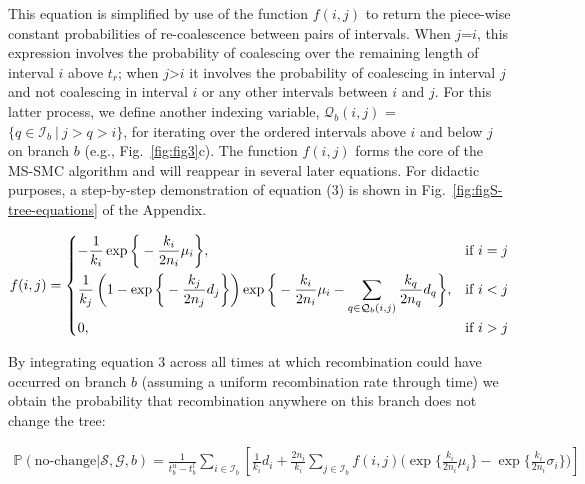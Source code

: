 \documentclass[11pt]{article}
\begin{document}
\noindent This equation is simplified by use of the function $f(i,j)$
to return the piece-wise constant probabilities of re-coalescence between
pairs of intervals. When $j$=$i$, this expression involves the probability of 
coalescing over the remaining length of interval $i$ above $t_r$; 
when $j$>$i$ it involves the probability of coalescing in interval 
$j$ and not coalescing in interval $i$ or any other intervals 
between $i$ and $j$. For this latter process, we define another
indexing variable, $\mathcal{Q}_b(i,j)$ = $\{q \in \mathcal{I}_b ~|~ j > q > i\}$, 
for iterating over the ordered intervals above $i$ and below $j$ 
on branch $b$ (e.g., Fig.~\ref{fig:fig3}c).
The function $f(i,j)$ forms the core of the MS-SMC algorithm and 
will reappear in several later equations. 
For didactic purposes, a step-by-step demonstration of equation (3) 
is shown in Fig.~\ref{fig:figS-tree-equations} of the Appendix.

\begin{equation}
\begin{aligned}	
	f(i,j) = 
	\begin{dcases}
		- \frac{1}{k_i} \exp \bigg\{-\frac{k_i}{2n_i}\mu_i \bigg\}, 
		& \text{if } i=j\\
		\frac{1}{k_j} \left(1 - \exp \bigg\{ -\frac{k_j}{2n_j} d_j \bigg\} 
		\right)
		\exp \bigg\{ -\frac{k_i}{2n_i}\mu_i - 
		\sum_{q \in \mathcal{Q}_b(i,j)} \frac{k_q}{2n_q} d_q \bigg \}, 
		& \text{if } i<j\\
		0, 
		& \text{if } i>j\\
	\end{dcases}
\end{aligned}
\end{equation}


\noindent By integrating equation 3 across all times at which recombination could
have occurred on branch $b$ (assuming a uniform recombination rate through time) 
we obtain the probability that recombination anywhere on this branch does not 
change the tree:


\begin{equation}
\begin{aligned}
	\mathbb{P}(\textrm{no-change} | \mathcal{S},\mathcal{G},b) = 
	\frac{1}{t_b^u - t_b^l}
	\sum_{i \in \mathcal{I}_b} \left[\frac{1}{k_i} d_i + 
	\frac{2n_i}{k_i} 
	\sum_{j \in \mathcal{I}_b}f(i,j)
	\bigg(
		\exp\bigg\{\frac{k_i}{2n_i}\mu_i \bigg\} - 
		\exp\bigg\{\frac{k_i}{2n_i}\sigma_i \bigg\}
	\bigg)\right]
\end{aligned}
\end{equation}
\end{document}

